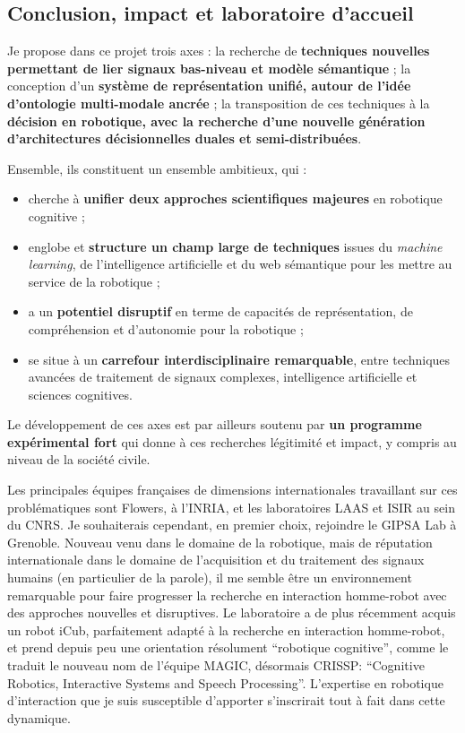 \documentclass[a4paper]{article}
\begin{document}
\subsection*{Conclusion, impact et laboratoire d'accueil}

Je propose dans ce projet trois axes : la recherche de
\textbf{techniques nouvelles permettant de lier signaux bas-niveau et modèle
sémantique} ; la conception d'un \textbf{système de représentation unifié,
autour de l'idée d'ontologie multi-modale ancrée} ; la transposition de ces
techniques à la \textbf{décision en robotique, avec la recherche d'une nouvelle
génération d'architectures décisionnelles duales et semi-distribuées}.

Ensemble, ils constituent un ensemble ambitieux, qui :
\begin{itemize}
    \item cherche à \textbf{unifier deux approches scientifiques majeures} en robotique
        cognitive ;
    \item englobe et \textbf{structure un champ large de techniques} issues du \emph{machine
        learning}, de l'intelligence artificielle et du web sémantique pour
        les mettre au service de la robotique ;
    \item a un \textbf{potentiel disruptif} en terme de capacités de représentation, de
        compréhension et d'autonomie pour la robotique ;
    \item se situe à un \textbf{carrefour interdisciplinaire remarquable}, entre
        techniques avancées de traitement de signaux complexes, intelligence
        artificielle et sciences cognitives.
\end{itemize}

Le développement de ces axes est par ailleurs soutenu par \textbf{un programme
expérimental fort} qui donne à ces recherches légitimité et impact, y compris au
niveau de la société civile.

Les principales équipes françaises de dimensions internationales travaillant sur
ces problématiques sont Flowers, à l'INRIA, et les laboratoires LAAS et ISIR au
sein du CNRS. Je souhaiterais cependant, en premier choix, rejoindre le GIPSA
Lab à Grenoble.  Nouveau venu dans le domaine de la robotique, mais de
réputation internationale dans le domaine de l'acquisition et du traitement des
signaux humains (en particulier de la parole), il me semble être un environnement
remarquable pour faire progresser la recherche en interaction homme-robot avec
des approches nouvelles et disruptives. Le laboratoire a de plus récemment
acquis un robot iCub, parfaitement adapté à la recherche en interaction
homme-robot, et prend depuis peu une orientation résolument ``robotique
cognitive'', comme le traduit le nouveau nom de l'équipe MAGIC, désormais
CRISSP: ``Cognitive Robotics, Interactive Systems and Speech Processing''.
L'expertise en robotique d'interaction que je suis susceptible d'apporter
s'inscrirait tout à fait dans cette dynamique.
\end{document}
